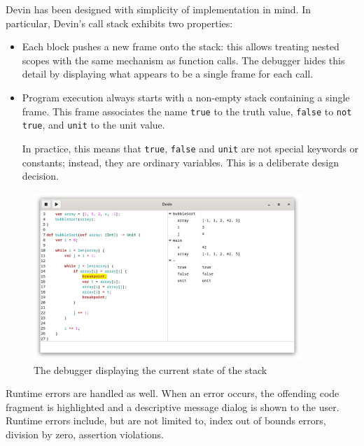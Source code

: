 \documentclass[UdineBachThesis,american,11pt]{PhdThesis}
\begin{document}
  Devin has been designed with simplicity of implementation in mind. In
  particular, Devin's call stack exhibits two properties:

  \begin{itemize}
    \item Each block pushes a new frame onto the stack: this allows treating
    nested scopes with the same mechanism as function calls. The debugger hides
    this detail by displaying what appears to be a single frame for each call.

    \item Program execution always starts with a non-empty stack containing a
    single frame. This frame associates the name \mbox{\texttt{true}} to the
    truth value, \mbox{\texttt{false}} to \mbox{\texttt{not true}}, and
    \mbox{\texttt{unit}} to the unit value.

    In practice, this means that \mbox{\texttt{true}}, \mbox{\texttt{false}} and
    \mbox{\texttt{unit}} are not special keywords or constants; instead, they
    are ordinary variables. This is a deliberate design decision.
  \end{itemize}

  \begin{figure}[H]
    \centering
    \includegraphics[width=0.9\textwidth]{5.png}
    \caption{The debugger displaying the current state of the stack}
    \label{figure:debugger}
  \end{figure}

  Runtime errors are handled as well. When an error occurs, the offending code
  fragment is highlighted and a descriptive message dialog is shown to the user.
  Runtime errors include, but are not limited to, index out of bounds errors,
  division by zero, assertion violations.
\end{document}

